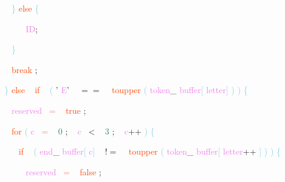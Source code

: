 \documentclass[8, usernames, dvipsnames]{beamer}
\begin{document}
\begin{frame}
\textcolor{White}{\   }
\textcolor{White}{\   }
\textcolor{White}{\   }
\textcolor{SkyBlue}{\} }
\textcolor{OrangeRed}{else}
\textcolor{SkyBlue}{\{ }

 \textcolor{White}{\   }
\textcolor{White}{\   }
\textcolor{White}{\   }
\textcolor{White}{\   }
\textcolor{OrangeRed}{	}
\textcolor{White}{\ }
\textcolor{Violet}{ID}\textcolor{Sepia}{;}

 \textcolor{White}{\   }
\textcolor{White}{\   }
\textcolor{White}{\   }
\textcolor{SkyBlue}{\} }

 
 \textcolor{White}{\   }
\textcolor{White}{\   }
\textcolor{White}{\   }
\textcolor{OrangeRed}{break}
\textcolor{Sepia}{;}

 \textcolor{White}{\   }
\textcolor{White}{\   }
\textcolor{SkyBlue}{\} }
\textcolor{OrangeRed}{else}
\textcolor{White}{\ }
\textcolor{OrangeRed}{if}
\textcolor{White}{\ }
\textcolor{SkyBlue}{(}
\textcolor{BurntOrange}{'}
\textcolor{Violet}{E}\textcolor{BurntOrange}{'}
\textcolor{White}{\ }
\textcolor{OliveGreen}{$==$}
\textcolor{White}{\ }
\textcolor{OrangeRed}{toupper}
\textcolor{SkyBlue}{(}
\textcolor{Violet}{token}\textcolor{Sepia}{\_}
\textcolor{Violet}{buffer}\textcolor{SkyBlue}{[}
\textcolor{Violet}{letter}\textcolor{SkyBlue}{]}
\textcolor{SkyBlue}{)}
\textcolor{SkyBlue}{)}
\textcolor{SkyBlue}{\{ }

 \textcolor{White}{\   }
\textcolor{White}{\   }
\textcolor{White}{\   }
\textcolor{Violet}{reserved}\textcolor{White}{\ }
\textcolor{Salmon}{=}
\textcolor{White}{\ }
\textcolor{OrangeRed}{true}
\textcolor{Sepia}{;}

 \textcolor{White}{\   }
\textcolor{White}{\   }
\textcolor{White}{\   }
\textcolor{OrangeRed}{for}
\textcolor{SkyBlue}{(}
\textcolor{Violet}{c}\textcolor{White}{\ }
\textcolor{Salmon}{=}
\textcolor{White}{\ }
\textcolor{SeaGreen}{0}
\textcolor{Sepia}{;}
\textcolor{White}{\ }
\textcolor{Violet}{c}\textcolor{White}{\ }
\textcolor{OliveGreen}{\textless}
\textcolor{White}{\ }
\textcolor{SeaGreen}{3}
\textcolor{Sepia}{;}
\textcolor{White}{\ }
\textcolor{Violet}{c}\textcolor{Apricot}{++}
\textcolor{SkyBlue}{)}
\textcolor{SkyBlue}{\{ }

 \textcolor{White}{\   }
\textcolor{White}{\   }
\textcolor{White}{\   }
\textcolor{White}{\   }
\textcolor{OrangeRed}{if}
\textcolor{White}{\ }
\textcolor{SkyBlue}{(}
\textcolor{Violet}{end}\textcolor{Sepia}{\_}
\textcolor{Violet}{buffer}\textcolor{SkyBlue}{[}
\textcolor{Violet}{c}\textcolor{SkyBlue}{]}
\textcolor{White}{\ }
\textcolor{OliveGreen}{$!=$}
\textcolor{White}{\ }
\textcolor{OrangeRed}{toupper}
\textcolor{SkyBlue}{(}
\textcolor{Violet}{token}\textcolor{Sepia}{\_}
\textcolor{Violet}{buffer}\textcolor{SkyBlue}{[}
\textcolor{Violet}{letter}\textcolor{Apricot}{++}
\textcolor{SkyBlue}{]}
\textcolor{SkyBlue}{)}
\textcolor{SkyBlue}{)}
\textcolor{SkyBlue}{\{ }

 \textcolor{White}{\   }
\textcolor{White}{\   }
\textcolor{White}{\   }
\textcolor{White}{\   }
\textcolor{White}{\   }
\textcolor{Violet}{reserved}\textcolor{White}{\ }
\textcolor{Salmon}{=}
\textcolor{White}{\ }
\textcolor{OrangeRed}{false}
\textcolor{Sepia}{;}

 \end{frame}
\end{document}

